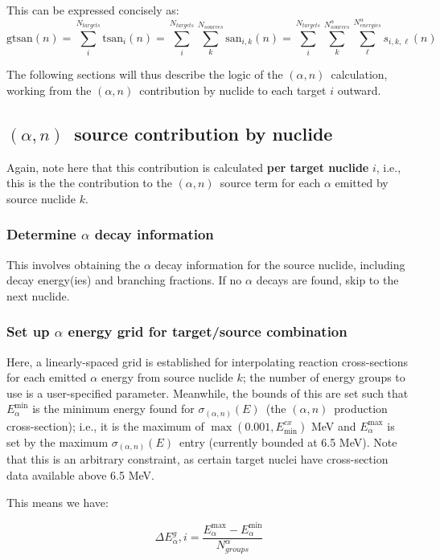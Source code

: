 \documentclass[10pt]{article}
\newcommand{\alphn}[0]{$\left(\alpha,n\right)$}
\newcommand{\sigan}[0]{\sigma_{\left(\alpha,n\right)}}
\begin{document}
This can be expressed concisely as:
\begin{equation}
\displaystyle \mathrm{gtsan}\left(n\right) = \sum_{i}^{N_{targets}} \mathrm{tsan}_i(n) = \sum_{i}^{N_{targets}} \sum_{k}^{N_{sources}} \mathrm{san}_{i,k}(n) = \sum_{i}^{N_{targets}} \sum_{k}^{N^\alpha_{sources}} \sum_{\ell}^{N^\alpha_{energies}} s_{i,k,\ell}(n)
\end{equation}

The following sections will thus describe the logic of the \alphn\ calculation, working from the \alphn\ contribution by nuclide to each target $i$ outward.

\subsection{\alphn\ source contribution by nuclide}
Again, note here that this contribution is calculated \textbf{per target nuclide} $i$, i.e., this is the the contribution to the \alphn\ source term for each $\alpha$ emitted by source nuclide $k$.

\subsubsection{Determine $\alpha$ decay information}

This involves obtaining the $\alpha$ decay information for the source nuclide, including decay energy(ies) and branching fractions. If no $\alpha$ decays are found, skip to the next nuclide.

\subsubsection{Set up $\alpha$ energy grid for target/source combination}
Here, a linearly-spaced grid is established for interpolating reaction cross-sections for each emitted $\alpha$ energy from source nuclide $k$; the number of energy groups to use is a user-specified parameter. Meanwhile, the bounds of this are set such that $E_\alpha^{\min}$ is the minimum energy found for $\sigan\left(E\right)$\ (the \alphn\ production cross-section); i.e., it is the maximum of $\max \left(0.001,E^{cx}_{\min} \right)$ MeV and $E_\alpha^{\max}$ is set by the maximum $\sigan\left(E\right)$\ entry (currently bounded at 6.5 MeV). Note that this is an arbitrary constraint, as certain target nuclei have cross-section data available above 6.5 MeV.

This means we have:

\begin{equation}
\Delta E_\alpha^g,i = \frac{E_\alpha^{\max} - E_\alpha^{\min} }{N^\alpha_{groups}}
\end{equation}
\end{document}
